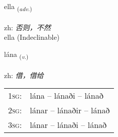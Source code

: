 \documentclass[frontgrid, backgrid]{flacards}\usepackage[]{graphicx}\usepackage[]{color}
\begin{document}

\renewcommand{\flhead}{\vskip5pt \fboxsep=0pt {\small\bfseries\footnotesize Atviksorð | 副词}}
\renewcommand{\fcfoot}{\vskip5pt \fboxsep=0pt \hspace{2pt}{\small\bfseries\footnotesize 2K}}

\renewcommand{\blhead}{\vskip5pt {\small\bfseries\footnotesize Atviksorð | 副词 }}
\renewcommand{\bcfoot}{\vskip5pt \hspace{2pt}{\small\bfseries\footnotesize 2K}}


{ella \small{\textsubscript{(\textit{adv.})}} \\[1ex]
\textphonetic{[ɛtla]} \\
zh: \emph{否则，不然} \\  [2ex]
ella (Indeclinable)}

\renewcommand{\flhead}{\vskip5pt \fboxsep=0pt {\small\bfseries\footnotesize Sagnorð | 动词}}
\renewcommand{\fcfoot}{\vskip5pt \fboxsep=0pt \hspace{2pt}{\small\bfseries\footnotesize 2K}}

\renewcommand{\blhead}{\vskip5pt {\small\bfseries\footnotesize Sagnorð | 动词 }}
\renewcommand{\bcfoot}{\vskip5pt \hspace{2pt}{\small\bfseries\footnotesize 2K}}


{lána \small{\textsubscript{(\textit{v.})}} \\[1ex] %
\textphonetic{[lauːna]} \\
zh: \emph{借，借给} \\  [2ex]
\renewcommand*{\arraystretch}{0.8}
\begin{tabular}{p{1cm}l}
\textsc{1sg}: & lána -- lánaði -- lánað \\ 
\textsc{2sg}: & lánar -- lánaðir -- lánað \\ 
\textsc{3sg}: & lánar -- lánaði -- lánað \\ 
\end{tabular}
}

\renewcommand{\flhead}{\vskip5pt \fboxsep=0pt {\small\bfseries\footnotesize Sagnorð | 动词}}
\renewcommand{\fcfoot}{\vskip5pt \fboxsep=0pt \hspace{2pt}{\small\bfseries\footnotesize 2K}}
\end{document}
